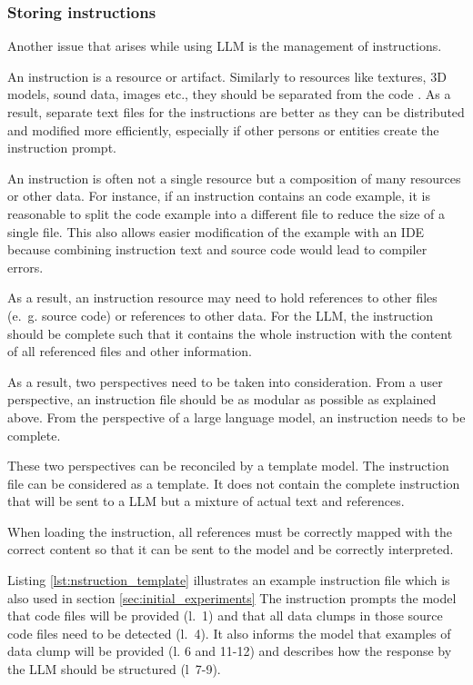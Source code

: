 \subsubsection{Storing instructions}\label{llm_msg_storage}

Another issue that arises while using \ac{LLM} is the management of instructions.

An instruction is a resource or artifact. Similarly to resources like textures, 3D models, sound data, images etc., they should be separated from the code \cite{separate_code_data}. As a result, separate text files for the instructions are better as they can be distributed and modified more efficiently, especially if other persons or entities create the instruction prompt.

An instruction is often not a single resource but a composition of many resources or other data. For instance, if an instruction contains an code example, it is reasonable to split the code example into a different file to reduce the size of a single file. This  also allows easier modification of the example with an IDE because combining instruction text and source code would lead to compiler errors.

As a result, an instruction resource may need to hold references to other files (e.~g. source code) or references to other data.
For the \ac{LLM}, the instruction should be complete such that it contains the whole instruction with the content of all referenced files and other information.

As a result, two perspectives need to be taken into consideration. From a user perspective, an instruction file should be as modular as possible as explained above. From the perspective of a large language model, an instruction needs to be complete. 

These two perspectives can be reconciled by a template model. The instruction file can be considered as a template. It does not contain the complete instruction that will be sent to a \ac{LLM} but a mixture of actual text and references.

When loading the instruction, all references must be correctly mapped with the correct content so that it can be sent to the model and be correctly interpreted. 

Listing \ref{lst:nstruction_template} illustrates an example instruction file which is also used in section \ref{sec:initial_experiments} The instruction prompts the model that code files will be provided (l.~1) and that all data clumps in those source code files need to be detected (l.~4). It also informs the model that examples of data clump will be provided (l. 6 and 11-12) and describes how the response by the \ac{LLM} should be structured (l~7-9). 

